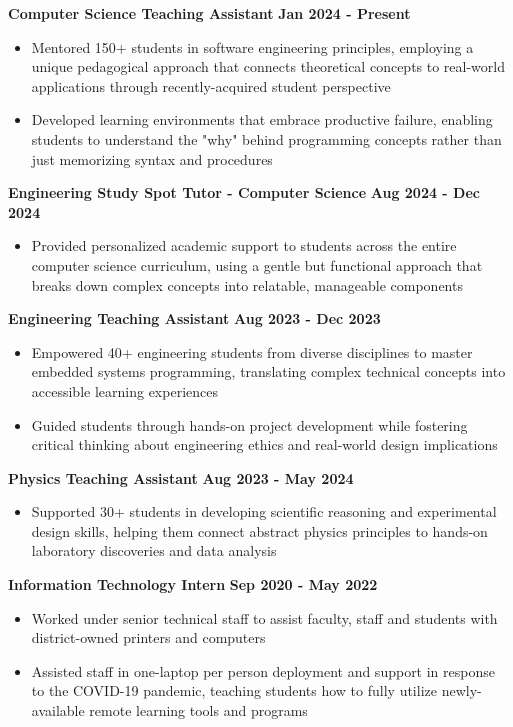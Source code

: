 \documentclass{article}
\begin{document}
\textbf{Computer Science Teaching Assistant} \hfill \textbf{Jan 2024 - Present}
\begin{itemize}[noitemsep,topsep=2pt]
	\item Mentored 150+ students in software engineering principles, employing a unique pedagogical approach that connects theoretical concepts to real-world applications through recently-acquired student perspective
	\item Developed learning environments that embrace productive failure, enabling students to understand the "why" behind programming concepts rather than just memorizing syntax and procedures
\end{itemize}

\textbf{Engineering Study Spot Tutor - Computer Science} \hfill \textbf{Aug 2024 - Dec 2024}
\begin{itemize}[noitemsep,topsep=2pt]
	\item Provided personalized academic support to students across the entire computer science curriculum, using a gentle but functional approach that breaks down complex concepts into relatable, manageable components
\end{itemize}

\textbf{Engineering Teaching Assistant} \hfill \textbf{Aug 2023 - Dec 2023}
\begin{itemize}[noitemsep,topsep=2pt]
	\item Empowered 40+ engineering students from diverse disciplines to master embedded systems programming, translating complex technical concepts into accessible learning experiences
	\item Guided students through hands-on project development while fostering critical thinking about engineering ethics and real-world design implications
\end{itemize}

\textbf{Physics Teaching Assistant} \hfill \textbf{Aug 2023 - May 2024}
\begin{itemize}[noitemsep,topsep=2pt]
	\item Supported 30+ students in developing scientific reasoning and experimental design skills, helping them connect abstract physics principles to hands-on laboratory discoveries and data analysis
\end{itemize}

 \hfill {}

\textbf{Information Technology Intern} \hfill \textbf{Sep 2020 - May 2022}
\begin{itemize}[noitemsep,topsep=2pt]
	\item Worked under senior technical staff to assist faculty, staff and students with district-owned printers and computers
	\item Assisted staff in one-laptop per person deployment and support in response to the COVID-19 pandemic, teaching students how to fully utilize newly-available remote learning tools and programs
\end{itemize}
\end{document}
